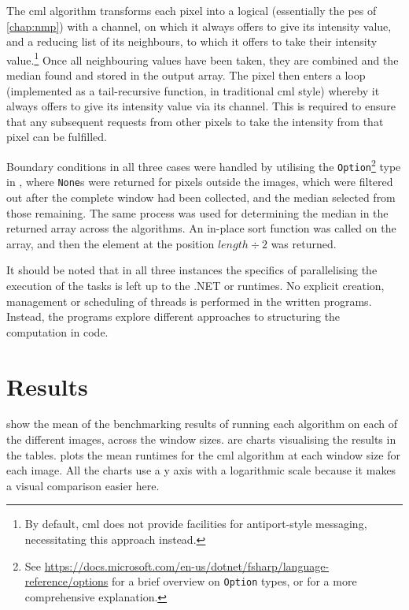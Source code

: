 The \gls{cml} algorithm transforms each pixel into a logical  (essentially the \glspl{pe} of \cref{chap:nmp}) with a channel, on which it always offers to give its intensity value, and a reducing list of its neighbours, to which it offers to take their intensity value.\footnote{By default, \gls{cml} does not provide facilities for antiport-style messaging, necessitating this approach instead.}  Once all neighbouring values have been taken, they are combined and the median found and stored in the output array.  The pixel then enters a loop (implemented as a tail-recursive function, in traditional \gls{cml} style) whereby it always offers to give its intensity value via its channel.  This is required to ensure that any subsequent requests from other pixels to take the intensity from that pixel can be fulfilled.

Boundary conditions in all three cases were handled by utilising the \texttt{Option}\footnote{See \url{https://docs.microsoft.com/en-us/dotnet/fsharp/language-reference/options} for a brief overview on \texttt{Option} types, or \eg{} \cite{Syme2015a} for a more comprehensive explanation.} type in \fsharp{}, where \texttt{None}s were returned for pixels outside the images, which were filtered out after the complete window had been collected, and the median selected from those remaining.  The same process was used for determining the median in the returned array across the algorithms.  An in-place sort function was called on the array, and then the element at the position \(\mathit{length} \div 2\) was returned.

It should be noted that in all three instances the specifics of parallelising the execution of the tasks is left up to the .NET or \hopac{} runtimes.  No explicit creation, management or scheduling of threads is performed in the written programs.  Instead, the programs explore different approaches to structuring the computation in code.

\section{Results}

 show the mean of the benchmarking results of running each algorithm on each of the different images, across the window sizes.   are charts visualising the results in the tables.   plots the mean runtimes for the \gls{cml} algorithm at each window size for each image.  All the charts use a y axis with a logarithmic scale because it makes a visual comparison easier here.

